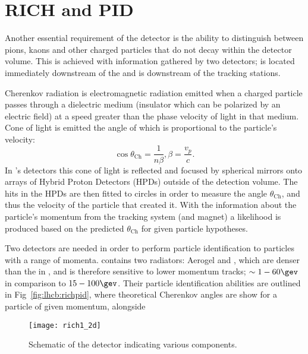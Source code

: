 \section{RICH and PID}
Another essential requirement of the \lhcb detector is the ability to distinguish between pions, kaons and
other charged particles that do not decay within the detector volume.
This is achieved with information gathered by two \rich detectors;
\richone is located immediately downstream of the \velo and \richtwo is downstream of the tracking
stations.

Cherenkov radiation is electromagnetic radiation emitted when a charged particle passes through a
dielectric medium (insulator which can be polarized by an electric field) at a speed greater than
the phase velocity of light in that medium.
Cone of light is emitted the angle of which is proportional to the particle's velocity:
\begin{equation}
  \cos\theta_\mathrm{Ch}=\frac1{n\beta}, \beta=\frac{v_p}{c}.
\end{equation}
In \lhcb's \rich detectors this cone of light is reflected and focused by spherical mirrors onto
arrays of Hybrid Proton Detectors (HPDs) outside of the detection volume.
The hits in the HPDs are then fitted to circles in order to measure the angle $\theta_\mathrm{Ch}$,
and thus the velocity of the particle that created it.
With the information about the particle's momentum from the tracking system (and magnet)
a likelihood is produced based on the predicted $\theta_\mathrm{Ch}$ for given particle hypotheses.

Two \rich detectors are needed in order to perform particle identification to particles with a
range of momenta.
\richone contains two radiators: Aerogel and \cfourften, which are denser than the \cffour in
\richtwo, and is therefore sensitive to lower momentum tracks; $\sim1-60\gev$ in comparison to
$15-100\gev$.
Their particle identification abilities are outlined in Fig~\ref{fig:lhcb:richpid}, where
theoretical Cherenkov angles are show for a particle of given momentum, alongside


\begin{figure}
  \begin{center}
    \texttt{[image: rich1\_2d]}
  \end{center}
  \caption{\small
    Schematic of the \lhcb \richone detector indicating various components.
  }
  \label{fig:lhcb:rich}
\end{figure}


